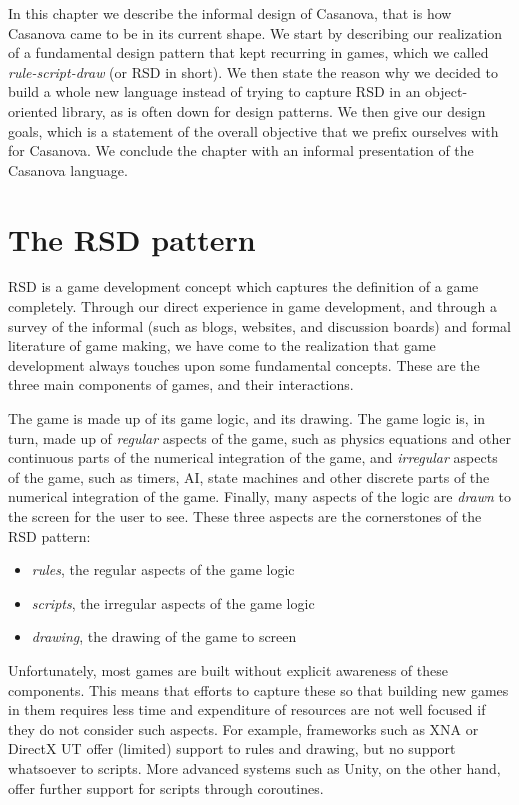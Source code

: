 In this chapter we describe the informal design of Casanova, that is how Casanova came to be in its current shape. We start by describing our realization of a fundamental design pattern that kept recurring in games, which we called \textit{rule-script-draw} (or RSD in short). We then state the reason why we decided to build a whole new language instead of trying to capture RSD in an object-oriented library, as is often down for design patterns. We then give our design goals, which is a statement of the overall objective that we prefix ourselves with for Casanova. We conclude the chapter with an informal presentation of the Casanova language.


\section{The RSD pattern}
RSD is a game development concept which captures the definition of a game completely. Through our direct experience in game development, and through a survey of the informal (such as blogs, websites, and discussion boards) and formal literature of game making, we have come to the realization that game development always touches upon some fundamental concepts. These are the three main components of games, and their interactions.

The game is made up of its game logic, and its drawing. The game logic is, in turn, made up of \textit{regular} aspects of the game, such as physics equations and other continuous parts of the numerical integration of the game, and \textit{irregular} aspects of the game, such as timers, AI, state machines and other discrete parts of the numerical integration of the game. Finally, many aspects of the logic are \textit{drawn} to the screen for the user to see. These three aspects are the cornerstones of the RSD pattern:

\begin{itemize}
\item \textit{rules}, the regular aspects of the game logic
\item \textit{scripts}, the irregular aspects of the game logic
\item \textit{drawing}, the drawing of the game to screen
\end{itemize}

Unfortunately, most games are built without explicit awareness of these components. This means that efforts to capture these so that building new games in them requires less time and expenditure of resources are not well focused if they do not consider such aspects. For example, frameworks such as XNA or DirectX UT offer (limited) support to rules and drawing, but no support whatsoever to scripts. More advanced systems such as Unity, on the other hand, offer further support for scripts through coroutines. 

